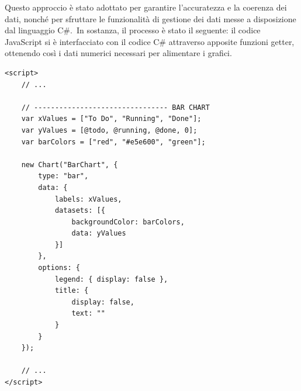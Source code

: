 Questo approccio è stato adottato per garantire l'accuratezza e la coerenza dei dati, nonché per sfruttare le funzionalità di gestione 
dei dati messe a disposizione dal linguaggio C\#.\
In sostanza, il processo è stato il seguente: il codice JavaScript si è interfacciato con il codice C\# attraverso apposite funzioni getter, 
ottenendo così i dati numerici necessari per alimentare i grafici.\
\begin{lstlisting}[style=javascript_style, caption=esempio sezione codice Javascript per la creazione di un grafico a barre per la rappresentazione dei dati]
<script>
	// ...
	
	// -------------------------------- BAR CHART
    var xValues = ["To Do", "Running", "Done"];
    var yValues = [@todo, @running, @done, 0];
    var barColors = ["red", "#e5e600", "green"];

    new Chart("BarChart", {
        type: "bar",
        data: {
            labels: xValues,
            datasets: [{
                backgroundColor: barColors,
                data: yValues
            }]
        },
        options: {
            legend: { display: false },
            title: {
                display: false,
                text: ""
            }
        }
    });

	// ...
</script>
\end{lstlisting}
%
